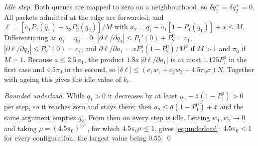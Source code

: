\documentclass[11pt,a4paper]{article}
\begin{document}
\emph{Idle step.} Both queues are mapped to zero on a neighbourhood, so $\delta q_1^+=\delta q_2^+=0$. All packets admitted at the edge are forwarded, and $\ell=[a_1P_1(q_1)+a_2P_2(q_2)]/M$ with $a_2=q_1+a_1[1-P_1(q_1)]+x\le M$. Differentiating at $q_1=q_2=0$: $|\partial\ell/\partial q_1|\le P_1'(0)+P_2^0=c_1$, $|\partial\ell/\partial q_2|\le P_2'(0)=c_2$, and $\partial\ell/\partial a_1=xP_1^0(1-P_2^0)/M^2$ if $M>1$ and $\pi_0$ if $M=1$. Because $a\le2.5\,a_1$, the product $1.8a\,|\partial\ell/\partial a_1|$ is at most $1.125P_1^0$ in the first case and $4.5\pi_0$ in the second, so $|\delta\ell|\le(c_1w_1+c_2w_2+4.5\pi_0\sigma)N$. Together with ageing this gives the idle value of $k_t$.

\emph{Bounded underload.} While $q_1>0$ it decreases by at least $\mu_1-\bar a(1-P_1^0)>0$ per step, so it reaches zero and stays there; then $a_2\le\bar a(1-P_1^0)+\bar x$ and the same argument empties $q_2$. From then on every step is idle. Letting $w_1,w_2\to0$ and taking $\rho=(4.5\pi_0)^{1/\tau}$, for which $4.5\pi_0\sigma\le1$, gives \eqref{eq:underload}; $4.5\pi_0<1$ for every configuration, the largest value being $0.55$. \qed
\end{document}
